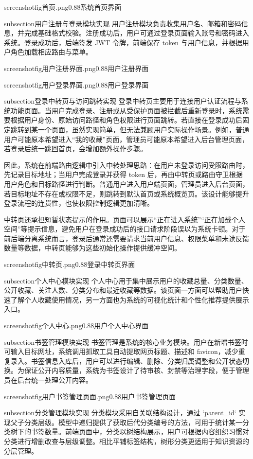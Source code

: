 screenshotfig{首页.png}{0.88}{系统首页界面}

subsection{用户注册与登录模块实现}
用户注册模块负责收集用户名、邮箱和密码信息，并完成基础格式校验。注册成功后，用户可通过登录页面输入账号和密码进入系统。登录成功后，后端签发 JWT 令牌，前端保存 token 与用户信息，并根据用户角色加载相应路由与菜单。

screenshotfig{用户注册界面.png}{0.88}{用户注册界面}

screenshotfig{用户登录界面.png}{0.88}{用户登录界面}

subsection{登录中转页与访问跳转实现}
登录中转页主要用于连接用户认证流程与系统功能页面。当用户完成登录、注册或从受保护页面被拦截后重新登录时，系统需要根据用户身份、原始访问路径和角色权限进行页面跳转。若直接在登录成功后固定跳转到某一个页面，虽然实现简单，但无法兼顾用户实际操作场景。例如，普通用户可能原本希望进入“我的收藏”页面，管理员可能原本希望进入后台管理页面，若登录后统一跳回首页，会增加额外操作步骤。

因此，系统在前端路由逻辑中引入中转处理思路：在用户未登录访问受限路由时，先记录目标地址；当用户完成登录并获得 token 后，再由中转页或路由守卫根据用户角色和目标路径进行判断。普通用户进入用户端页面，管理员进入后台页面，若目标地址不存在或权限不足，则跳转到默认首页或系统概览页。该设计能够提升登录流程的连贯性，也使权限控制逻辑更加清晰。

中转页还承担短暂状态提示的作用。页面可以展示“正在进入系统”“正在加载个人空间”等提示信息，避免用户在登录成功后的接口请求阶段误以为系统卡顿。对于前后端分离系统而言，登录后通常还需要请求当前用户信息、权限菜单和未读反馈数量等数据，中转页能够为这些初始化操作提供缓冲空间。

screenshotfig{中转页.png}{0.88}{登录中转页界面}

subsection{个人中心模块实现}
个人中心用于集中展示用户的收藏总量、分类数量、公开收藏、关注人数、分类分布和最近收藏等数据。该页面一方面可以帮助用户快速了解个人收藏使用情况，另一方面也为系统的可视化统计和个性化推荐提供展示入口。

screenshotfig{个人中心.png}{0.88}{用户个人中心界面}

subsection{书签管理模块实现}
书签管理是系统的核心业务模块。用户在新增书签时可输入目标网址，系统调用抓取工具自动提取网页标题、描述和 favicon，减少重复录入。书签信息入库后，用户可以进行编辑、删除、分类归属调整和公开状态切换。为保证公开内容质量，系统为书签设计了待审核、封禁等治理字段，便于管理员在后台统一处理公开内容。

screenshotfig{用户书签管理页面.png}{0.88}{用户书签管理页面}

subsection{分类管理模块实现}
分类模块采用自关联结构设计，通过 `parent_id` 实现父子分类层级。模型中递归提供了获取后代分类编号的方法，可用于统计某一分类树下的书签数量。前端页面中，分类以树结构展示，用户可根据内容组织习惯对分类进行增删改查与层级调整。相比平铺标签结构，树形分类更适用于知识资源的分层管理。

